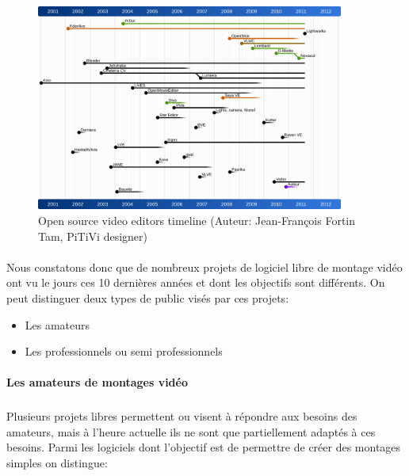 \begin{figure} [h]
  \begin{center}
    \includegraphics[width=0.9\textwidth]{images/open-source-video-editor-timeline}
  \end{center} \caption{Open source video editors timeline (Auteur:
  Jean-François Fortin Tam, PiTiVi designer)} \label{Yes}
\end{figure}

\paragraph{ }

Nous constatons donc que de nombreux projets de logiciel libre de montage
vidéo ont vu le jours ces 10 dernières années et dont les objectifs
sont différents. On peut distinguer deux types de public visés par
ces projets:

\begin {itemize}

  \item {Les amateurs}

  \item {Les professionnels ou semi professionnels}
\end {itemize}

\paragraph {Les amateurs de montages vidéo}

\subparagraph{}

Plusieurs projets libres permettent ou visent à répondre aux besoins
des amateurs, mais à l'heure actuelle ils ne sont que partiellement
adaptés à ces besoins. Parmi les logiciels dont l'objectif est de
permettre de créer des montages simples on distingue:

